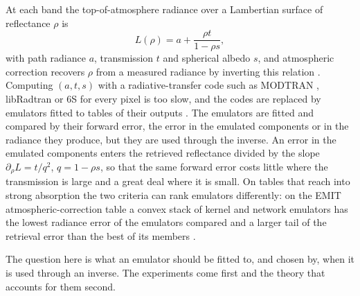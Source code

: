 \documentclass[11pt]{article}
\theoremstyle{remark}
\newcommand{\1}{\mathbf{1}}
\begin{document}
At each band the top-of-atmosphere radiance over a Lambertian surface of reflectance $\rho$ is
\[
L(\rho)=a+\frac{\rho t}{1-\rho s},
\]
with path radiance $a$, transmission $t$ and spherical albedo $s$, and atmospheric correction recovers $\rho$ from a
measured radiance by inverting this relation \cite{isofit}. Computing $(a,t,s)$ with a radiative-transfer code such as
MODTRAN \cite{modtran}, libRadtran \cite{mayer,emde} or 6S \cite{vermote} for every pixel is too slow, and the codes
are replaced by emulators fitted to tables of their outputs \cite{brodrick,vicentservera}. The emulators are fitted and
compared by their forward error, the error in the emulated components or in the radiance they produce, but they are
used through the inverse. An error in the emulated components enters the retrieved reflectance divided by the slope
$\partial_\rho L=t/q^2$, $q=1-\rho s$, so that the same forward error costs little where the transmission is large and
a great deal where it is small. On tables that reach into strong absorption the two criteria can rank emulators
differently: on the EMIT atmospheric-correction table a convex stack of kernel and network emulators has the lowest
radiance error of the emulators compared and a larger tail of the retrieval error than the best of its members
\cite{shmalo2}.

The question here is what an emulator should be fitted to, and chosen by, when it is used through an inverse. The
experiments come first and the theory that accounts for them second.
\end{document}

